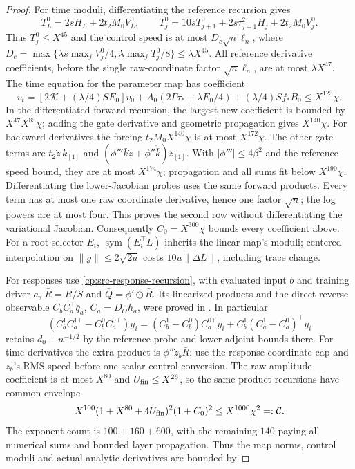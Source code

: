 \begin{proof}
For time moduli, differentiating the reference recursion gives
\[
T_L^0=2sH_L+2t_2M_0V_L^0,\qquad
T_j^0=10sT_{j+1}^0+2s\tau_{j+1}^2H_j+2t_2M_0V_j^0.
\]
Thus $T_j^0\le X^{45}$ and the control speed is at most
$D_c\sqrt n\ell_n$, where
$D_c=\max\{\lambda s\max_jV_j^0/4,\lambda\max_jT_j^0/8\}
\le\lambda X^{45}$.
All reference derivative coefficients, before the single raw-coordinate
factor $\sqrt n\ell_n$, are at most $\lambda X^{47}$.
The time equation for the parameter map has coefficient
\[
v_t=[2\mathcal K+(\lambda/4)SE_0]v_0
 +A_0(2\Gamma\tau_*+\lambda E_0/4)+(\lambda/4)Sf_*B_0
 \le X^{125}\chi.
\]
In the differentiated forward recursion, the largest new coefficient
is bounded by $X^{47}X^{85}\chi$; adding the gate derivative and
geometric propagation gives $X^{140}\chi$.
For backward derivatives the forcing
$t_2M_0X^{140}\chi$ is at most $X^{172}\chi$.
The other gate terms are $t_2\dot z\,k_{[1]}$ and
$(\phi'''\bar k\dot z+\phi''\dot{\bar k})z_{[1]}$.
With $|\phi'''|\le4\beta^2$ and the reference speed bound, they are
at most $X^{174}\chi$; propagation and all sums fit below
$X^{190}\chi$.
Differentiating the lower-Jacobian probes uses the same forward
products. Every term has at most one raw coordinate derivative,
hence one factor $\sqrt n$; the log powers are at most four.
This proves the second row without differentiating the variational Jacobian.
Consequently $C_0=X^{300}\chi$ bounds every coefficient above.
For a root selector $E_i$, $\operatorname{sym}(E_i^\top L)$
inherits the linear map's moduli; centered interpolation on
$\|g\|\le2\sqrt{2u}$ costs $10u\|\Delta L\|$, including trace change.

For responses use \eqref{cp:src-response-recursion}, with evaluated
input $b$ and training driver $a$, $\bar R=R/S$ and
$\bar Q=\phi'\odot\bar R$. Its linearized products and the direct
reverse observable $C_bC_a^\top\bar q_a$, $C_a=D_\Theta h_a$,
were proved in . In particular
\[
(C_b^1C_a^{1\top}-C_b^0C_a^{0\top})y_i
=(C_b^1-C_b^0)C_a^{0\top}y_i
 +C_b^1(C_a^1-C_a^0)^\top y_i
\]
retains $d_0+n^{-1/2}$ by the reference-probe and lower-adjoint bounds
there. For time derivatives the extra product is
$\phi''\dot z_b\bar R$: use the response coordinate cap and $z_b$'s
RMS speed before one scalar-control conversion. The raw amplitude
coefficient is at most $X^{80}$ and $U_{\rm fin}\le X^{26}$, so
the same product recursions have common envelope
\[
X^{100}(1+X^{80}+4U_{\rm fin})^2(1+C_0)^2
 \le X^{1000}\chi^2=:\mathcal C.
\]
The exponent count is $100+160+600$, with the remaining $140$ paying
all numerical sums and bounded layer propagation. Thus the map norms,
control moduli and actual analytic derivatives are bounded by


\end{proof}
